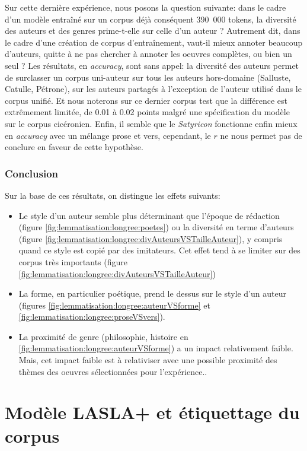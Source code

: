 Sur cette dernière expérience, nous posons la question suivante: dans le cadre d'un modèle entraîné sur un corpus déjà conséquent 390~000 tokens, la diversité des auteurs et des genres prime-t-elle sur celle d'un auteur ? Autrement dit, dans le cadre d'une création de corpus d'entraînement, vaut-il mieux annoter beaucoup d'auteurs, quitte à ne pas chercher à annoter les oeuvres complètes, ou bien un seul ? Les résultats, en \textit{accuracy}, sont sans appel: la diversité des auteurs permet de surclasser un corpus uni-auteur sur tous les auteurs hors-domaine (Salluste, Catulle, Pétrone), sur les auteurs partagés à l'exception de l'auteur utilisé dans le corpus unifié. Et nous noterons sur ce dernier corpus test que la différence est extrêmement limitée, de 0.01 à 0.02 points malgré une spécification du modèle sur le corpus cicéronien. Enfin, il semble que le \textit{Satyricon} fonctionne enfin mieux en \textit{accuracy} avec un mélange prose et vers, cependant, le $r$ ne nous permet pas de conclure en faveur de cette hypothèse.

\subsubsection{Conclusion}

Sur la base de ces résultats, on distingue les effets suivants:
\begin{itemize}
    \item Le style d'un auteur semble plus déterminant que l'époque de rédaction (figure \ref{fig:lemmatisation:longree:poetes}) ou la diversité en terme d'auteurs (figure \ref{fig:lemmatisation:longree:divAuteursVSTailleAuteur}), y compris quand ce style est copié par des imitateurs. Cet effet tend à se limiter sur des corpus très importants (figure \ref{fig:lemmatisation:longree:divAuteursVSTailleAuteur})
    \item La forme, en particulier poétique, prend le dessus sur le style d'un auteur (figures \ref{fig:lemmatisation:longree:auteurVSforme} et \ref{fig:lemmatisation:longree:proseVSvers}).
    \item La proximité de genre (philosophie, histoire en \ref{fig:lemmatisation:longree:auteurVSforme}) a un impact relativement faible. Mais, cet impact faible est à relativiser avec une possible proximité des thèmes des oeuvres sélectionnées pour l'expérience..
\end{itemize}

\section{Modèle LASLA+ et étiquettage du corpus}

